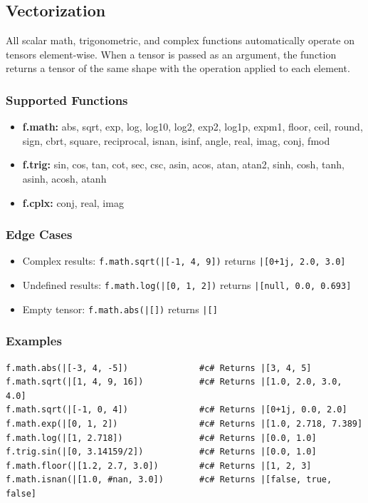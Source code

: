 \subsection{Vectorization}
All scalar math, trigonometric, and complex functions automatically operate on tensors element-wise. When a tensor is passed as an argument, the function returns a tensor of the same shape with the operation applied to each element.

\subsubsection{Supported Functions}
\begin{itemize}
\item \textbf{f.math:} abs, sqrt, exp, log, log10, log2, exp2, log1p, expm1, floor, ceil, round, sign, cbrt, square, reciprocal, isnan, isinf, angle, real, imag, conj, fmod
\item \textbf{f.trig:} sin, cos, tan, cot, sec, csc, asin, acos, atan, atan2, sinh, cosh, tanh, asinh, acosh, atanh
\item \textbf{f.cplx:} conj, real, imag
\end{itemize}

\subsubsection{Edge Cases}
\begin{itemize}
\item Complex results: \texttt{f.math.sqrt(|[-1, 4, 9])} returns \texttt{|[0+1j, 2.0, 3.0]}
\item Undefined results: \texttt{f.math.log(|[0, 1, 2])} returns \texttt{|[null, 0.0, 0.693]}
\item Empty tensor: \texttt{f.math.abs(|[])} returns \texttt{|[]}
\end{itemize}

\subsubsection{Examples}
\begin{verbatim}
f.math.abs(|[-3, 4, -5])              #c# Returns |[3, 4, 5]
f.math.sqrt(|[1, 4, 9, 16])           #c# Returns |[1.0, 2.0, 3.0, 4.0]
f.math.sqrt(|[-1, 0, 4])              #c# Returns |[0+1j, 0.0, 2.0]
f.math.exp(|[0, 1, 2])                #c# Returns |[1.0, 2.718, 7.389]
f.math.log(|[1, 2.718])               #c# Returns |[0.0, 1.0]
f.trig.sin(|[0, 3.14159/2])           #c# Returns |[0.0, 1.0]
f.math.floor(|[1.2, 2.7, 3.0])        #c# Returns |[1, 2, 3]
f.math.isnan(|[1.0, #nan, 3.0])       #c# Returns |[false, true, false]
\end{verbatim}


